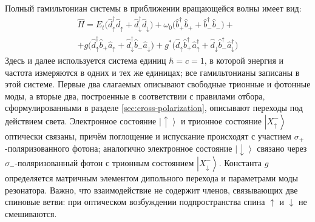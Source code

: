 \documentclass[11pt]{article}    %
\numberwithin{equation}{section}
\begin{document}
Полный гамильтониан системы в приближении вращающейся волны имеет вид:
\begin{gather}
    \hat{H} = E_t \bigl( \hat{d}^{\dag}_{\uparrow} \hat{d}_{\uparrow}
    + \hat{d}^{\dag}_{\downarrow} \hat{d}_{\downarrow} \bigr)
    + \omega_0 \bigl( \hat{b}^{\dag}_{+} \hat{b}_{+}
    + \hat{b}^{\dag}_{-} \hat{b}_{-} \bigr) +
    \\ \nonumber
    + g \bigl( \hat{d}^{\dag}_{\uparrow} \hat{b}_{+} \hat{a}_{\uparrow}
    + \hat{d}^{\dag}_{\downarrow} \hat{b}_{-} \hat{a}_{\downarrow} \bigr)
    + g^{*} \bigl( \hat{d}_{\uparrow} \hat{b}^{\dag}_{+} \hat{a}^{\dag}_{\uparrow}
    + \hat{d}_{\downarrow} \hat{b}^{\dag}_{-} \hat{a}^{\dag}_{\downarrow} \bigr)
\end{gather}
Здесь и далее используется система единиц $\hbar = c = 1$, в которой
энергия и частота измеряются в одних и тех же единицах; все
гамильтонианы записаны в этой системе.
Первые два слагаемых описывают свободные трионные и фотонные моды, а
вторые два, построенные в соответствии с правилами
отбора, сформулированными в разделе \ref{sec:cross-polarization},
описывают переходы под действием света.
Электронное состояние $\left|\uparrow\right\rangle$ и трионное состояние
$\left|X^-_{\uparrow}\right\rangle$ оптически связаны, причём поглощение и испускание
происходят с участием $\sigma_+$-поляризованного фотона; аналогично
электронное состояние $\left|\downarrow\right\rangle$
связано через $\sigma_-$-поляризованный
фотон с трионным состоянием $\left|X^-_{\downarrow}\right\rangle$.
Константа $g$ определяется матричным элементом дипольного
перехода и параметрами моды резонатора. Важно, что взаимодействие
не содержит членов, связывающих две спиновые ветви: при
оптическом возбуждении подпространства спина $\uparrow$ и $\downarrow$
не смешиваются.
\end{document}
